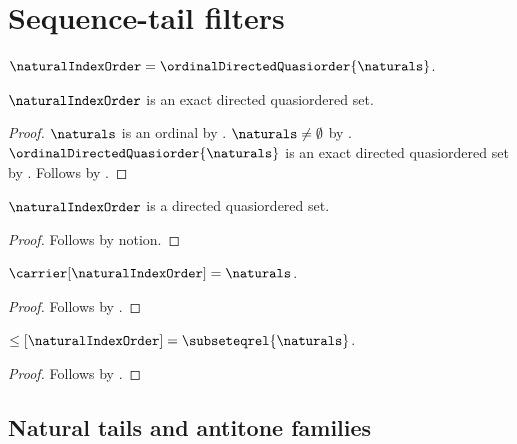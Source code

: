 \section{Sequence-tail filters}




\begin{definition}\label{natural_index_order}
    $\naturalIndexOrder=\ordinalDirectedQuasiorder{\naturals}$.
\end{definition}

\begin{classification}\label{natural_index_order_is_exact}
    $\naturalIndexOrder$ is an exact directed quasiordered set.
\end{classification}
\begin{proof}
    $\naturals$ is an ordinal by .
    $\naturals\neq\emptyset$ by .
    $\ordinalDirectedQuasiorder{\naturals}$ is an exact directed
        quasiordered set by
        .
    Follows by .
\end{proof}

\begin{proposition}\label{natural_index_order_is_directed}
    $\naturalIndexOrder$ is a directed quasiordered set.
\end{proposition}
\begin{proof}
    Follows by notion.
\end{proof}

\begin{proposition}\label{natural_index_order_carrier}
    $\carrier[\naturalIndexOrder]=\naturals$.
\end{proposition}
\begin{proof}
    Follows by
        .
\end{proof}

\begin{proposition}\label{natural_index_order_relation}
    $\leq[\naturalIndexOrder]=\subseteqrel{\naturals}$.
\end{proposition}
\begin{proof}
    Follows by
        .
\end{proof}

\subsection{Natural tails and antitone families}

